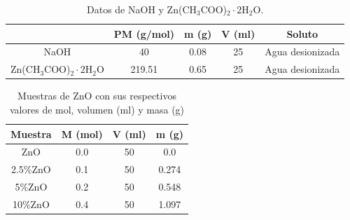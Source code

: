 \documentclass[12pt]{article}
\begin{document}
\begin{table}[h]
\caption{Datos de NaOH y Zn(CH$_{3}$COO)$_{2} \cdot 2$H$_{2}$O.}
\centering
\begin{tabular}{|c|c|c|c|c|}
\hline
 & PM (g/mol) & m (g) & V (ml) & Soluto\\
\hline
NaOH & 40 & 0.08 & 25 & Agua desionizada\\
\hline
Zn(CH$_{3}$COO)$_{2} \cdot 2$H$_{2}$O & 219.51 & 0.65 & 25 & Agua desionizada\\
\hline
\end{tabular}
\label{tabla_naoh_znch3coo}
\end{table}


\begin{table}[ht]
    \centering
      \caption{Muestras de ZnO con sus respectivos valores de mol, volumen (ml) y masa (g)}
    \begin{tabular}{|c|c|c|c|}
        \hline
        Muestra & M (mol) & V (ml) & m (g) \\
        \hline
        ZnO & 0.0 & 50 & 0.0 \\
        \hline
        2.5\%ZnO & 0.1 & 50 & 0.274 \\
        \hline
        5\%ZnO & 0.2 & 50 & 0.548 \\
        \hline
        10\%ZnO & 0.4 & 50 & 1.097 \\
        \hline
        \end{tabular}
    \label{tab:ZnOGO}
\end{table}
\end{document}
